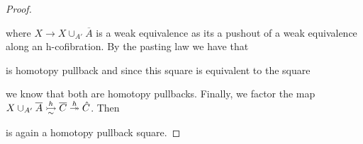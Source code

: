 \begin{prop}
\begin{proof}
\begin{center}
\begin{tikzcd} [sep = 4em]
            \end{tikzcd}
        \end{center}
        where $X\to X\cup_{A'}\overline{A}$ is a weak equivalence as its a pushout of a weak equivalence along an h-cofibration. %
        By the pasting law we have that
        \begin{center}
        \end{center}
        is homotopy pullback and since this square is equivalent %
        to the square
        \begin{center}
        \end{center}
        we know that both are homotopy pullbacks.
        Finally, we factor the map $X\cup_{A'}\overline{A}\xtailrightarrow[\sim]{h}\overline{C}\xtwoheadrightarrow{h}\hat{C}$.
        Then 
        \begin{center}
        \end{center}
        is again a homotopy pullback square. %


\end{proof}
\end{prop}
